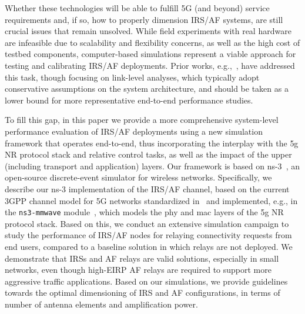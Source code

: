 Whether these technologies will be able to fulfill 5G (and beyond) service requirements and, if so, how to properly dimension IRS/AF systems, are still crucial issues that remain unsolved. 
While field experiments with real hardware are infeasible due to scalability and flexibility concerns, as well as the high cost of testbed components, computer-based simulations represent a viable approach for testing and calibrating IRS/AF deployments. %
Prior works, e.g.,~\cite{wu2018intelligent,9282349}, have addressed this task, though focusing on link-level analyses, which typically adopt conservative assumptions on the system architecture, and should be taken as a lower bound for more representative end-to-end performance studies.

To fill this gap, in this paper we provide a more comprehensive system-level performance evaluation of IRS/AF deployments using a new simulation
framework that operates end-to-end, thus incorporating the interplay with the \gls{5g} NR protocol stack and relative control tasks, as well as the impact of the upper (including transport and application) layers.
Our framework is based on \mbox{ns-3}~\cite{ns3}, an open-source discrete-event simulator for wireless networks.
Specifically, we describe our ns-3 implementation of the IRS/AF channel, based on the current 3GPP channel model for 5G networks standardized in~\cite{3gpp.38.901} and implemented, e.g., in the \texttt{ns3-mmwave} module~\cite{mezzavilla2018end}, which models the \gls{phy} and \gls{mac} layers of the \gls{5g} NR protocol stack.
Based on this, we conduct an extensive simulation campaign to study the performance of IRS/AF nodes for relaying connectivity requests from end users, compared to a baseline solution in which relays are not deployed. 
We demonstrate that IRSs and AF relays are valid solutions, especially in small networks, even though high-EIRP AF relays are required to support more aggressive traffic applications.
Based on our simulations, we provide guidelines towards the optimal dimensioning of IRS and AF configurations, in terms of number of antenna elements and amplification power.


